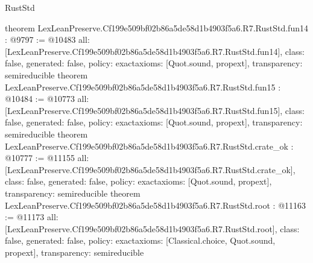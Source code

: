 \begin{lexlean}{RustStd}
\begin{coremodule}
{}
theorem LexLeanPreserve.Cf199e509bf02b86a5de58d1b4903f5a6.R7.RustStd.fun14 : @9797 := @10483 {
  all: [LexLeanPreserve.Cf199e509bf02b86a5de58d1b4903f5a6.R7.RustStd.fun14],
  class: false,
  generated: false,
  policy: exact{axioms: [Quot.sound, propext]},
  transparency: semireducible
}
theorem LexLeanPreserve.Cf199e509bf02b86a5de58d1b4903f5a6.R7.RustStd.fun15 : @10484 := @10773 {
  all: [LexLeanPreserve.Cf199e509bf02b86a5de58d1b4903f5a6.R7.RustStd.fun15],
  class: false,
  generated: false,
  policy: exact{axioms: [Quot.sound, propext]},
  transparency: semireducible
}
theorem LexLeanPreserve.Cf199e509bf02b86a5de58d1b4903f5a6.R7.RustStd.crate_ok : @10777 := @11155 {
  all: [LexLeanPreserve.Cf199e509bf02b86a5de58d1b4903f5a6.R7.RustStd.crate_ok],
  class: false,
  generated: false,
  policy: exact{axioms: [Quot.sound, propext]},
  transparency: semireducible
}
theorem LexLeanPreserve.Cf199e509bf02b86a5de58d1b4903f5a6.R7.RustStd.root : @11163 := @11173 {
  all: [LexLeanPreserve.Cf199e509bf02b86a5de58d1b4903f5a6.R7.RustStd.root],
  class: false,
  generated: false,
  policy: exact{axioms: [Classical.choice, Quot.sound, propext]},
  transparency: semireducible
}


\end{coremodule}
\end{lexlean}
